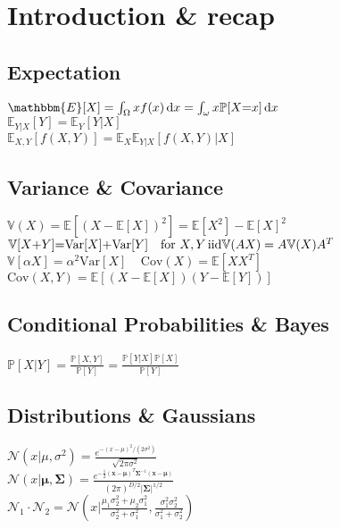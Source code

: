 \section*{Introduction \& recap}
\subsection*{Expectation}
$\mathbbm{E}[X]=\int_{\Omega}xf(x)\di x=\int_{\omega}x\mathbb{P}[X{=}x]\di x$ \\
$\mathbb{E}_{Y|X}[Y]=\mathbb{E}_{Y}[Y|X]$\\
$\mathbb{E}_{X,Y}[f(X,Y)]=\mathbb{E}_{X}\mathbb{E}_{Y|X}[f(X,Y)|X]$

\subsection*{Variance \& Covariance}
$\mathbb{V}(X){=}\mathbb{E}[(X{-}\mathbb{E}[X])^2]{=}\mathbb{E}[X^2]{-}\mathbb{E}[X]^2$\\
$\mathbb{V}[X{+}Y]{=}\mathrm{Var}[X]{+}\mathrm{Var}[Y] \quad \text{for }X,Y \,\text{iid} \\
\mathbb{V}(AX) = A \mathbb{V}(X) A^T$ \\
$\mathbb{V}[\alpha X]=\alpha^2\mathrm{Var}[X]\ \ \ \ \  \mathrm{Cov}(X)=\mathbb{E}[XX^T]$ \\
$\mathrm{Cov}(X,Y)=\mathbb{E}[(X-\mathbb{E}[X])(Y-\mathbb{E}[Y])]$

\subsection*{Conditional Probabilities \& Bayes}
$\mathbb{P}[X|Y]=\frac{\mathbb{P}[X,Y]}{\mathbb{P}[Y]}=\frac{\mathbb{P}[Y|X]\mathbb{P}[X]}{\mathbb{P}[Y]}$

\subsection*{Distributions \& Gaussians}
$\mathcal{N}(x|\mu, \sigma^2)=\frac{e^{-(x-\mu)^2/(2\sigma^2)}}{\sqrt{2\pi\sigma^2}}$\\
$\mathcal{N}(x|\bm{\mu}, \bm{\Sigma})= \frac{e^{-\frac{1}{2}(\mathbf{x}-\bm{\mu})^T\bm{\Sigma}^{-1}(\mathbf{x}-\bm{\mu})}}{(2\pi)^{D/2}|\bm{\Sigma}|^{1/2}} $\\
$\mathcal{N}_1\cdot\mathcal{N}_2=\mathcal{N}(x|\frac{\mu_1 \sigma_2^2 + \mu_2 \sigma_1^2}{\sigma_2^2 + \sigma_1^2}, \frac{\sigma_1^2 \sigma_2^2}{\sigma_1^2 + \sigma_2^2})$\\

